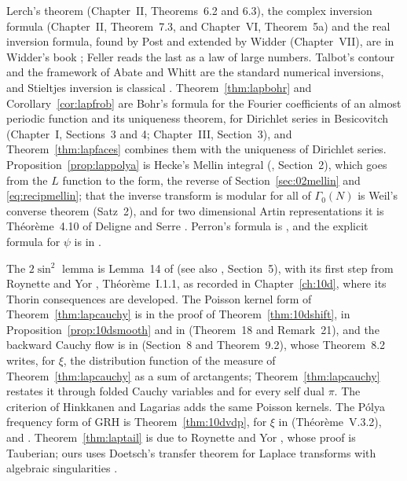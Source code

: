 Lerch's theorem (Chapter~II, Theorems~6.2 and 6.3), the complex inversion formula (Chapter~II, Theorem~7.3, and Chapter~VI, Theorem~5a) and the real inversion formula, found by Post and extended by Widder (Chapter~VII), are in Widder's book \cite{widder1941}; Feller \cite{feller1971} reads the last as a law of large numbers. Talbot's contour \cite{talbot1979} and the framework of Abate and Whitt \cite{abatewhitt2006} are the standard numerical inversions, and Stieltjes inversion is classical \cite{stieltjes1894,akhiezer1965}. Theorem~\ref{thm:lapbohr} and Corollary~\ref{cor:lapfrob} are Bohr's formula for the Fourier coefficients of an almost periodic function and its uniqueness theorem, for Dirichlet series in Besicovitch \cite{besicovitch1932} (Chapter~I, Sections~3 and 4; Chapter~III, Section~3), and Theorem~\ref{thm:lapfaces} combines them with the uniqueness of Dirichlet series. Proposition~\ref{prop:lappolya} is Hecke's Mellin integral (\cite{hecke1936}, Section~2), which goes from the $L$ function to the form, the reverse of Section~\ref{sec:02mellin} and \eqref{eq:recipmellin}; that the inverse transform is modular for all of $\Gamma_0(N)$ is Weil's converse theorem \cite{weil1967} (Satz~2), and for two dimensional Artin representations it is Th\'eor\`eme~4.10 of Deligne and Serre \cite{deligneserre1974}. Perron's formula is \cite{perron1908}, and the explicit formula for $\psi$ is in \cite{davenport2000}.

The $2\sin^2$ lemma is Lemma~14 of \cite{polson2018vdp} (see also \cite{polson2017}, Section~5), with its first step from Roynette and Yor \cite{roynetteyor2005}, Th\'eor\`eme~I.1.1, as recorded in Chapter~\ref{ch:10d}, where its Thorin consequences are developed. The Poisson kernel form of Theorem~\ref{thm:lapcauchy} is in the proof of Theorem~\ref{thm:10dshift}, in Proposition~\ref{prop:10dsmooth} and in \cite{polson2018vdp} (Theorem~18 and Remark~21), and the backward Cauchy flow is in \cite{polson2017} (Section~8 and Theorem~9.2), whose Theorem~8.2 writes, for $\xi$, the distribution function of the measure of Theorem~\ref{thm:lapcauchy} as a sum of arctangents; Theorem~\ref{thm:lapcauchy} restates it through folded Cauchy variables and for every self dual $\pi$. The criterion of Hinkkanen and Lagarias \cite{hinkkanen1997,lagarias1999} adds the same Poisson kernels. The P\'olya frequency form of GRH is Theorem~\ref{thm:10dvdp}, for $\xi$ in \cite{roynetteyor2005} (Th\'eor\`eme~V.3.2), \cite{polson2018vdp} and \cite{konstantopoulospatiesarkar2024}. Theorem~\ref{thm:laptail} is due to Roynette and Yor \cite{roynetteyor2005}, whose proof is Tauberian; ours uses Doetsch's transfer theorem for Laplace transforms with algebraic singularities \cite{doetsch1974}.

